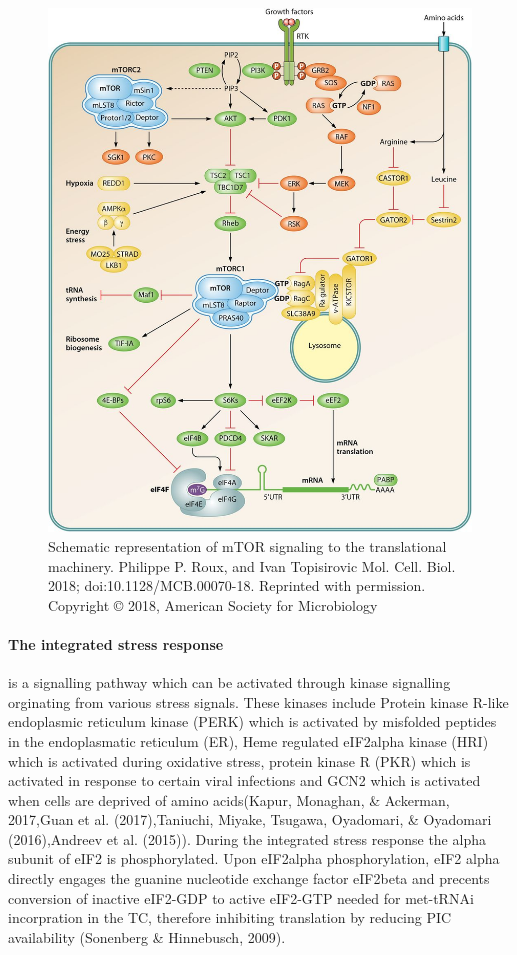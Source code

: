\documentclass[12pt,openany]{book}
\begin{document}
\begin{figure}
  \includegraphics{./figures/mTORsignal.jpg}
  \caption{Schematic representation of mTOR signaling to the translational machinery. Philippe P. Roux, and Ivan Topisirovic Mol. Cell. Biol. 2018; doi:10.1128/MCB.00070-18. Reprinted with permission. Copyright © 2018, American Society for Microbiology
 \label{fig:mtorsignal}}
\end{figure}

\clearpage
\paragraph{The integrated stress response} is a signalling pathway which
can be activated through kinase signalling orginating from various
stress signals. These kinases include Protein kinase R-like endoplasmic
reticulum kinase (PERK) which is activated by misfolded peptides in the
endoplasmatic reticulum (ER), Heme regulated eIF2alpha kinase (HRI)
which is activated during oxidative stress, protein kinase R (PKR) which
is activated in response to certain viral infections and GCN2 which is
activated when cells are deprived of amino acids(Kapur, Monaghan, \&
Ackerman, 2017,Guan et al. (2017),Taniuchi, Miyake, Tsugawa, Oyadomari,
\& Oyadomari (2016),Andreev et al. (2015)). During the integrated stress
response the alpha subunit of eIF2 is phosphorylated. Upon eIF2alpha
phosphorylation, eIF2 alpha directly engages the guanine nucleotide
exchange factor eIF2beta and precents conversion of inactive eIF2-GDP to
active eIF2-GTP needed for met-tRNAi incorpration in the TC, therefore
inhibiting translation by reducing PIC availability (Sonenberg \&
Hinnebusch, 2009).
\end{document}

